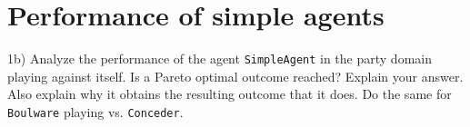 \section{Performance of simple agents}

1b) Analyze the performance of the agent \texttt{SimpleAgent} in the party domain playing against itself. Is a Pareto optimal outcome reached? Explain your answer. Also explain why it obtains the resulting outcome that it does. Do the same for \texttt{Boulware} playing vs. \texttt{Conceder}.